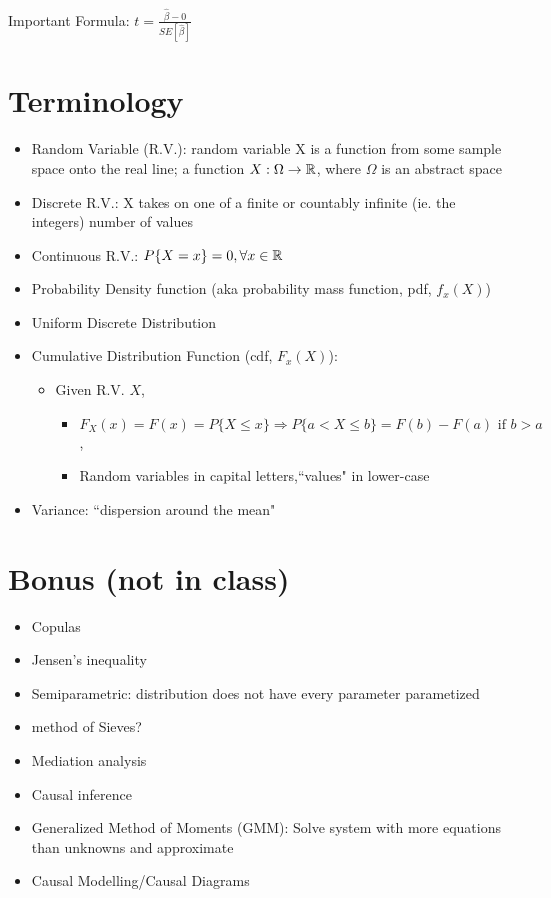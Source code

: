 Important Formula: $t=\frac{\hat \beta -0}{SE[\hat \beta]}$

\section{Terminology}
\begin{itemize}
    \item Random Variable (R.V.): random variable X is a function from some sample space onto the real line; a function $X: \Omega \rightarrow \mathbb{R}$, where $\Omega$ is an abstract space
    \item Discrete R.V.: X takes on one of a finite or countably infinite (ie. the integers) number of values
    \item Continuous R.V.: $P\{X=x\}=0, \forall x \in \mathbb{R}$
    \item Probability Density function (aka probability mass function, pdf, $f_x(X)$)
    \item Uniform Discrete Distribution
    \item Cumulative Distribution Function (cdf, $F_x(X)$): 
    \begin{itemize}
        \item Given R.V. $X$, 
        \begin{itemize}
            \item $F_X(x) = F(x)=P\{X\leq x\}\Rightarrow P\{a<X\leq b\}=F(b)-F(a) \text{ if } b> a$, 
            \item Random variables in capital letters,``values" in lower-case
        \end{itemize}
        
    \end{itemize}
    \item Variance: ``dispersion around the mean"
\end{itemize}


\section{Bonus (not in class)}
\begin{itemize}
    \item Copulas
    \item Jensen's inequality
    \item Semiparametric: distribution does not have every parameter parametized
    \item method of Sieves?
    \item Mediation analysis
    \item Causal inference
    \item Generalized Method of Moments (GMM): Solve system with more equations than unknowns and approximate
    \item Causal Modelling/Causal Diagrams
\end{itemize}